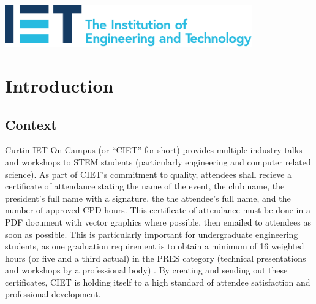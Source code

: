 \documentclass[11pt]{article}
\begin{document}
\begin{titlepage}
    
    \vfill
    \includegraphics[width=0.8\textwidth]{../../assets/IET_Logo_Blue_RGB.pdf}\\
     
    
    \vfill %
    
\end{titlepage}


\tableofcontents

\bigskip

\listoffigures

\newpage


\setcounter{page}{1}

\section{Introduction}

\subsection{Context}

Curtin IET On Campus (or ``CIET'' for short) provides multiple industry talks and workshops to STEM students (particularly engineering and computer related science). As part of CIET's commitment to quality, attendees shall recieve a certificate of attendance stating the name of the event, the club name, the president's full name with a signature, the the attendee's full name, and the number of approved CPD hours. This certificate of attendance must be done in a PDF document with vector graphics where possible, then emailed to attendees as soon as possible. This is particularly important for undergraduate engineering students, as one graduation requirement is to obtain a minimum of 16 weighted hours (or five and a third actual) in the PRES category (technical presentations and workshops by a professional body) \cite{eng-logbook}. By creating and sending out these certificates, CIET is holding itself to a high standard of attendee satisfaction and professional development.
\end{document}
